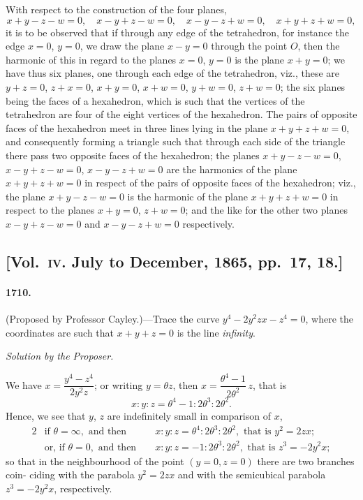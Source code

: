 \documentclass[11pt,a4paper]{article}
\begin{document}
With respect to the construction of the four planes,
\[
x+y-z-w=0,\quad x-y+z-w=0,\quad x-y-z+w=0,\quad x+y+z+w=0,
\]
it is to be observed that if through any edge of the tetrahedron, for instance the
edge $x=0$, $y=0$, we draw the plane $x-y=0$ through the point $O$, then the harmonic
of this in regard to the planes $x=0$, $y=0$ is the plane $x+y=0$; we have thus six
planes, one through each edge of the tetrahedron, viz., these are $y+z=0$, $z+x=0$,
$x+y=0$, $x+w=0$, $y+w=0$, $z+w=0$; the six planes being the faces of a hexahedron,
which is such that the vertices of the tetrahedron are four of the eight vertices of
the hexahedron. The pairs of opposite faces of the hexahedron meet in three lines
lying in the plane $x+y+z+w=0$, and consequently forming a triangle such that
through each side of the triangle there pass two opposite faces of the hexahedron;
the planes $x+y-z-w=0$, $x-y+z-w=0$, $x-y-z+w=0$ are the harmonics of the
plane $x+y+z+w=0$ in respect of the pairs of opposite faces of the hexahedron;
viz., the plane $x+y-z-w=0$ is the harmonic of the plane $x+y+z+w=0$ in respect
to the planes $x+y=0$, $z+w=0$; and the like for the other two planes $x-y+z-w=0$
and $x-y-z+w=0$ respectively.

\subsection*{[Vol.~\textsc{iv}. July to December, 1865, pp.\ 17, 18.]}

\paragraph*{1710.} (Proposed by Professor Cayley.)---Trace the curve $y^4 - 2y^2zx - z^4 = 0$, where
the coordinates are such that $x+y+z=0$ is the line \textit{infinity}.

\begin{center}
\textit{Solution by the Proposer.}
\end{center}

We have $x = \dfrac{y^4-z^4}{2y^2z}$; or writing $y=\theta z$, then $x = \dfrac{\theta^4-1}{2\theta^2}\,z$, that is
\[
x : y : z = \theta^4-1 : 2\theta^3 : 2\theta^2.
\]
Hence, we see that $y$, $z$ are indefinitely small in comparison of $x$,
\begin{alignat*}{2}
&\text{if } \theta=\infty, \text{ and then } &&x:y:z = \theta^4 : 2\theta^3 : 2\theta^2, \text{ that is } y^2=2zx;\\
&\text{or, if } \theta=0, \text{ and then } &&x:y:z = -1 : 2\theta^3 : 2\theta^2, \text{ that is } z^3 = -2y^2x;
\end{alignat*}
so that in the neighbourhood of the point $(y=0, z=0)$ there are two branches coin-
\noindent ciding with the parabola $y^2=2zx$ and with the semicubical parabola $z^3=-2y^2x$,
respectively.
\end{document}
